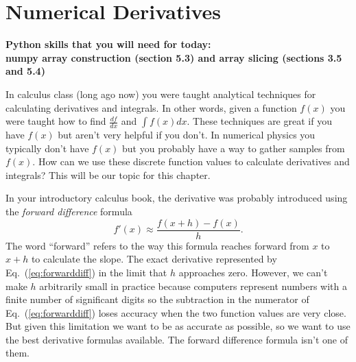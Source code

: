 \chapter[Derivatives and Integrals]{Numerical Derivatives}
\label{ch:derivs}
\begin{center}
\textbf{Python skills that you will need for today:\\
   numpy array construction (section 5.3) and array slicing (sections
   3.5 and 5.4)}
\end{center}
In calculus class (long ago now) you were taught analytical techniques
for calculating derivatives and integrals.  In other words, given a
function $f(x)$ you were taught how to find $\frac{df}{dx}$ and $\int
f(x) dx$.  These techniques are great if you have $f(x)$ but aren't
very helpful if you don't.  In numerical physics you typically don't
have $f(x)$ but you probably have a way to gather samples from $f(x)$.
How can we use these discrete function values to calculate
derivatives and integrals? This will be our topic for this chapter.



In your introductory calculus book, the derivative was probably
introduced using the {\it forward difference} formula
\begin{equation}\label{eq:forwarddiff}
     f'(x) \approx \frac{f(x+h)-f(x)}{h} .
\end{equation}
The word ``forward'' refers to the way this formula reaches forward
from $x$ to $x+h$ to calculate the slope. The exact derivative
represented by Eq.~(\ref{eq:forwarddiff}) in the limit that $h$
approaches zero.  However, we can't make $h$ arbitrarily small in
practice because computers represent numbers with a finite number of
significant digits so the subtraction in the numerator of
Eq.~(\ref{eq:forwarddiff}) loses accuracy when the two function values
are very close. But given this limitation we want to be as accurate as
possible, so we want to use the best derivative formulas
available. The forward difference formula isn't one of them.


